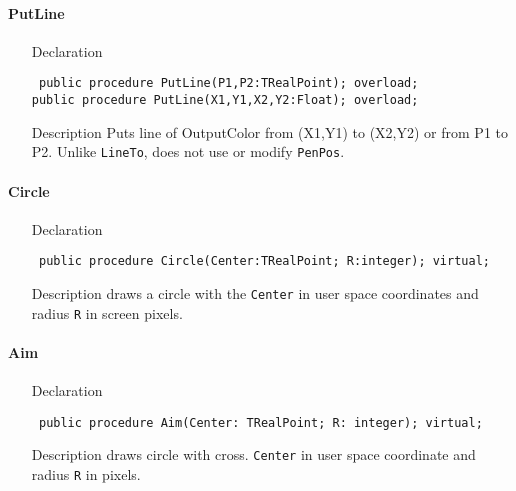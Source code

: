 \documentclass[12pt,a4paper,oneside]{report}
\newcommand{\declarationitem}[1]{{\addfontfeatures{FakeBold=1.3} #1}}
\newcommand{\descriptiontitle}[1]{{\addfontfeatures{FakeSlant}#1}}
\newcommand{\code}[1]{\texttt{#1}}
\begin{document}
\paragraph{PutLine}\hspace*{\fill}
\label{lmcoordsys.TCoordSys-PutLine}
\begin{itemize}\item[\declarationitem{Declaration}\hfill]
\begin{flushleft}
\code{
public procedure PutLine(P1,P2:TRealPoint); overload;\\
public procedure PutLine(X1,Y1,X2,Y2:Float); overload;}
\end{flushleft}
\item[\descriptiontitle{Description}]
Puts line of OutputColor from (X1,Y1) to (X2,Y2) or from P1 to P2. Unlike \code{LineTo}, does not use or modify \code{PenPos}.
\end{itemize}


\paragraph{Circle}\hspace*{\fill}
\label{lmcoordsys.TCoordSys-Circle}
\begin{itemize}\item[\declarationitem{Declaration}\hfill]
\begin{flushleft}
\code{
public procedure Circle(Center:TRealPoint; R:integer); virtual;}
\end{flushleft}
\item[\descriptiontitle{Description}]
draws a circle with the \code{Center} in user space coordinates and radius \code{R} in screen pixels.
\end{itemize}
\paragraph{Aim}\hspace*{\fill}
\label{lmcoordsys.TCoordSys-Aim}
\begin{itemize}\item[\declarationitem{Declaration}\hfill]
\begin{flushleft}
\code{
public procedure Aim(Center: TRealPoint; R: integer); virtual;}
\end{flushleft}
\item[\descriptiontitle{Description}]
draws circle with cross. \code{Center} in user space coordinate and radius \code{R} in pixels.
\end{itemize}
\end{document}
